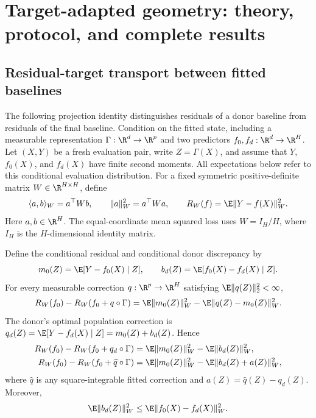 \section{Target-adapted geometry: theory, protocol, and complete results}
\label{app:target-geometry}

\subsection{Residual-target transport between fitted baselines}
\label{app:target-transport}

The following projection identity distinguishes residuals of a donor
baseline from residuals of the final baseline. Condition on the fitted
state, including a measurable representation
$\Gamma:\R^d\to\R^p$ and two predictors
$f_0,f_d:\R^d\to\R^H$. Let $(X,Y)$ be a fresh evaluation pair,
write $Z=\Gamma(X)$, and assume that $Y$, $f_0(X)$, and $f_d(X)$
have finite second moments. All expectations below refer to this
conditional evaluation distribution. For a fixed symmetric
positive-definite matrix $W\in\R^{H\times H}$, define
\[
 \langle a,b\rangle_W=a^\top Wb,\qquad
 \|a\|_W^2=a^\top Wa,\qquad
 R_W(f)=\E\|Y-f(X)\|_W^2.
\]
Here $a,b\in\R^H$. The equal-coordinate mean squared loss uses
$W=I_H/H$, where $I_H$ is the $H$-dimensional identity matrix.

\begin{proposition}
\label{prop:target-transport}
Define the conditional residual and conditional donor discrepancy by
\[
 m_0(Z)=\E[Y-f_0(X)\mid Z],\qquad
 b_d(Z)=\E[f_0(X)-f_d(X)\mid Z].
\]
For every measurable correction $q:\R^p\to\R^H$ satisfying
$\E\|q(Z)\|_2^2<\infty$,
\begin{equation}
 R_W(f_0)-R_W(f_0+q\circ\Gamma)
 =\E\|m_0(Z)\|_W^2-\E\|q(Z)-m_0(Z)\|_W^2.
 \label{eq:target-general-gain}
\end{equation}
The donor's optimal population correction is
$q_d(Z)=\E[Y-f_d(X)\mid Z]=m_0(Z)+b_d(Z)$. Hence
\begin{align}
 R_W(f_0)-R_W(f_0+q_d\circ\Gamma)
 &=\E\|m_0(Z)\|_W^2-\E\|b_d(Z)\|_W^2,
 \label{eq:target-transport-proof}\\
 R_W(f_0)-R_W(f_0+\widehat q\circ\Gamma)
 &=\E\|m_0(Z)\|_W^2-\E\|b_d(Z)+a(Z)\|_W^2,
 \label{eq:target-fitted-transport}
\end{align}
where $\widehat q$ is any square-integrable fitted correction and
$a(Z)=\widehat q(Z)-q_d(Z)$. Moreover,
\[
 \E\|b_d(Z)\|_W^2\leq\E\|f_0(X)-f_d(X)\|_W^2.
\]
\end{proposition}

